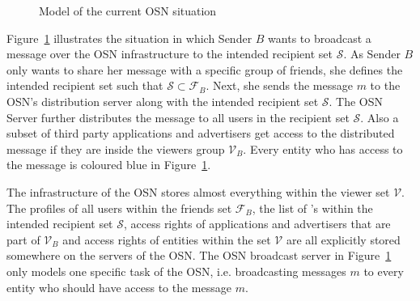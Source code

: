 \begin{figure}[ht]
\begin{center}
{
    }
    \end{center}
    \caption{Model of the current OSN situation}
    \label{fig:current_model}
\end{figure}

Figure~\ref{fig:current_model} illustrates the situation in which Sender $B$ wants to broadcast a message over the OSN infrastructure to the intended recipient set $\mathcal{S}$. As Sender $B$ only wants to share her message with a specific group of friends, she defines the intended recipient set such that $\mathcal{S} \subset \mathcal{F}_B$. Next, she sends the message $m$ to the OSN's distribution server along with the intended recipient set $\mathcal{S}$. The OSN Server further distributes the message to all users in the recipient set $\mathcal{S}$. Also a subset of third party applications and advertisers get access to the distributed message if they are inside the viewers group $\mathcal{V}_B$. Every entity who has access to the message is coloured blue in Figure~\ref{fig:current_model}.

The infrastructure of the OSN stores almost everything within the viewer set $\mathcal{V}$. The profiles of all users within the friends set $\mathcal{F}_B$, the list of \id{}'s within the intended recipient set $\mathcal{S}$, access rights of applications and advertisers that are part of $\mathcal{V}_B$ and access rights of entities within the set $\mathcal{V}$ are all explicitly stored somewhere on the servers of the OSN. The OSN broadcast server in Figure~\ref{fig:current_model} only models one specific task of the OSN, i.e. broadcasting messages $m$ to every entity who should have access to the message $m$.

